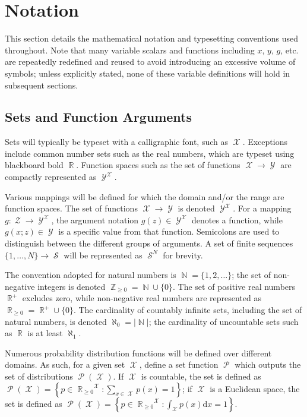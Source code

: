 \documentclass[12pt]{article}
\DeclareMathOperator{\Xcal}{\mathcal{X}}
\DeclareMathOperator{\Ycal}{\mathcal{Y}}
\DeclareMathOperator{\Zcal}{\mathcal{Z}}
\DeclareMathOperator{\Scal}{\mathcal{S}}
\DeclareMathOperator{\Pcal}{\mathcal{P}}
\DeclareMathOperator{\Rbb}{\mathbb{R}}
\DeclareMathOperator{\Nbb}{\mathbb{N}}
\DeclareMathOperator{\Zbb}{\mathbb{Z}}
\begin{document}
\section{Notation}

This section details the mathematical notation and typesetting conventions used throughout. Note that many variable scalars and functions including $x$, $y$, $g$, etc. are repeatedly redefined and reused to avoid introducing an excessive volume of symbols; unless explicitly stated, none of these variable definitions will hold in subsequent sections.


\subsection*{Sets and Function Arguments}

Sets will typically be typeset with a calligraphic font, such as $\Xcal$. Exceptions include common number sets such as the real numbers, which are typeset using blackboard bold $\Rbb$. Function spaces such as the set of functions $\Xcal \to \Ycal$ are compactly represented as $\Ycal^{\Xcal}$.

Various mappings will be defined for which the domain and/or the range are function spaces. The set of functions $\Xcal \to \Ycal$ is denoted $\Ycal^{\Xcal}$. For a mapping $g : \Zcal \to \Ycal^{\Xcal}$, the argument notation $g(z) \in \Ycal^{\Xcal}$ denotes a function, while $g(x;z) \in \Ycal$ is a specific value from that function. Semicolons are used to distinguish between the different groups of arguments. A set of finite sequences $\{1,\ldots,N\} \to \Scal$ will be represented as $\Scal^N$ for brevity.

The convention adopted for natural numbers is $\Nbb = \{1,2,\ldots\}$; the set of non-negative integers is denoted $\Zbb_{\geq 0} = \Nbb \cup \{0\}$. The set of positive real numbers $\Rbb^+$ excludes zero, while non-negative real numbers are represented as $\Rbb_{\geq 0} = \Rbb^+ \cup \{0\}$. The cardinality of countably infinite sets, including the set of natural numbers, is denoted $\aleph_0 = |\Nbb|$; the cardinality of uncountable sets such as $\Rbb$ is at least $\aleph_1$.

Numerous probability distribution functions will be defined over different domains. As such, for a given set $\Xcal$, define a set function $\Pcal$ which outputs the set of distributions $\Pcal(\Xcal)$. If $\Xcal$ is countable, the set is defined as $\Pcal(\Xcal) = \left\{ p \in {\Rbb_{\geq 0}}^{\Xcal}: \sum_{x \in \Xcal} p(x) = 1 \right\}$; if $\Xcal$ is a Euclidean space, the set is defined as $\Pcal(\Xcal) = \left\{ p \in {\Rbb_{\geq 0}}^{\Xcal}: \int_{\Xcal} p(x) \mathrm{d}x = 1 \right\}$.
\end{document}
